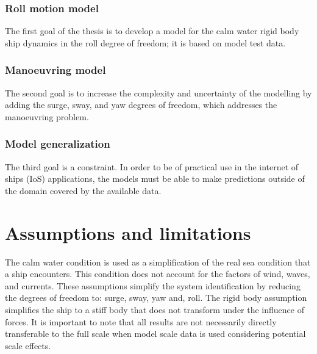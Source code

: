 \subsubsection*{\normalfont \color{black} \textbf{Roll motion model}}
The first goal of the thesis is to develop a model for the calm water rigid body ship dynamics in the roll degree of freedom; it is based on model test data.

\subsubsection*{\normalfont \color{black} \textbf{Manoeuvring model}}
The second goal is to increase the complexity and uncertainty of the modelling by adding the surge, sway, and yaw degrees of freedom, which addresses the manoeuvring problem.

\subsubsection*{\normalfont \color{black} \textbf{Model generalization}}
The third goal is a constraint. In order to be of practical use in the internet of ships (IoS) applications, the models must be able to make predictions outside of the domain covered by the available data.

\section{Assumptions and limitations}
The calm water condition is used as a simplification of the real sea condition that a ship encounters. This condition does not account for the factors of wind, waves, and currents. These assumptions simplify the system identification by reducing the degrees of freedom to: surge, sway, yaw and, roll. 
The rigid body assumption simplifies the ship to a stiff body that does not transform under the influence of forces. 
It is important to note that all results are not necessarily directly transferable to the full scale when model scale data is used considering potential scale effects. 

